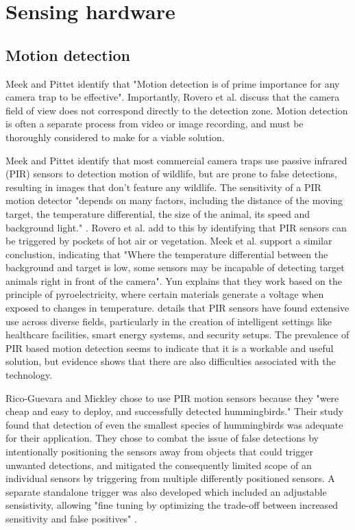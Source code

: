 \documentclass[class=report,11pt,crop=false]{standalone}
\begin{document}
\section{Sensing hardware}

\subsection{Motion detection}

Meek and Pittet \cite{meek2012user} identify that "Motion detection is of prime importance for any camera trap to be effective". Importantly, Rovero et al. \cite{rovero2013which} discuss that the camera field of view does not correspond directly to the detection zone. Motion detection is often a separate process from video or image recording, and must be thoroughly considered to make for a viable solution.

Meek and Pittet \cite{meek2012user} identify that most commercial camera traps use passive infrared (PIR) sensors to detection motion of wildlife, but are prone to false detections, resulting in images that don't feature any wildlife. The sensitivity of a PIR motion detector "depends on many factors, including the distance of the moving target, the temperature differential, the size of the animal, its speed and background light." \cite{meek2012user}. Rovero et al. \cite{rovero2013which} add to this by identifying that PIR sensors can be triggered by pockets of hot air or vegetation. Meek et al. \cite{meek2012introduction} support a similar conclustion, indicating that "Where the temperature differential between the background and target is low, some sensors may be incapable of detecting target animals right in front of the camera". Yun \cite{yun2014detecting} explains that they work based on the principle of pyroelectricity, where certain materials generate a voltage when exposed to changes in temperature. \cite{amusa2015pyro} details that PIR sensors have found extensive use across diverse fields, particularly in the creation of intelligent settings like healthcare facilities, smart energy systems, and security setups.
The prevalence of PIR based motion detection seems to indicate that it is a workable and useful solution, but evidence shows that there are also difficulties associated with the technology.

Rico-Guevara and Mickley \cite{rico-guevara2017bring} chose to use PIR motion sensors because they "were cheap and easy to deploy, and successfully detected hummingbirds." Their study found that detection of even the smallest species of hummingbirds was adequate for their application. They chose to combat the issue of false detections by intentionally positioning the sensors away from objects that could trigger unwanted detections, and mitigated the consequently limited scope of an individual sensors by triggering from multiple differently positioned sensors. A separate standalone trigger was also developed which included an adjustable sensistivity, allowing "fine tuning by optimizing the trade-off between increased sensitivity and false positives" \cite{rico-guevara2017bring}.
\end{document}
